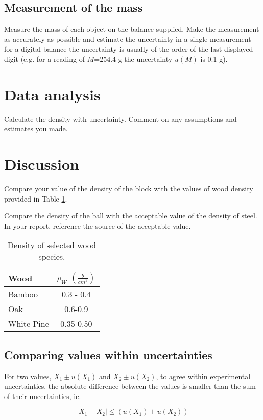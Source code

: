 \documentclass[justified]{tufte-handout}
\begin{document}
\subsection{Measurement of the mass}
Measure the mass of each object on the balance supplied.  Make the measurement as accurately as possible and estimate the uncertainty in a single measurement - for a digital balance the uncertainty is usually of the order of the last displayed digit (e.g. for a reading of $M$=254.4 g the uncertainty $u(M)$ is 0.1 g). 

\section{Data analysis}
Calculate the density with uncertainty. Comment on any assumptions and estimates you made.

\section{Discussion}
Compare your value of the density of the block with the values of wood density provided in Table \ref{table:wood}. 

Compare the density of the ball with the acceptable value of the density of steel. In your report, reference the source of the acceptable value. 

\begin{table}[ht]
    \centering
    \begin{tabular}{|l|c|}
    \hline
        \textbf{Wood} & $\rho_W$ $(\frac{g}{cm^3})$  \\
        \hline
         Bamboo& 0.3 - 0.4\\
         Oak& 0.6-0.9 \\
         White Pine& 0.35-0.50\\
         \hline
    \end{tabular}
    \caption{Density of selected wood species.}
    \label{table:wood}
\end{table}

\subsection{Comparing values within uncertainties}
For two values, $X_1 \pm u(X_1)$ and $X_2\pm u(X_2)$, to agree within experimental uncertainties, the absolute difference between the values is smaller than the sum of their uncertainties, ie.

\begin{equation}
\label{eq:unc_agreement}
|X_1-X_2|\leq(u(X_1)+u(X_2))
\end{equation}
\end{document}
